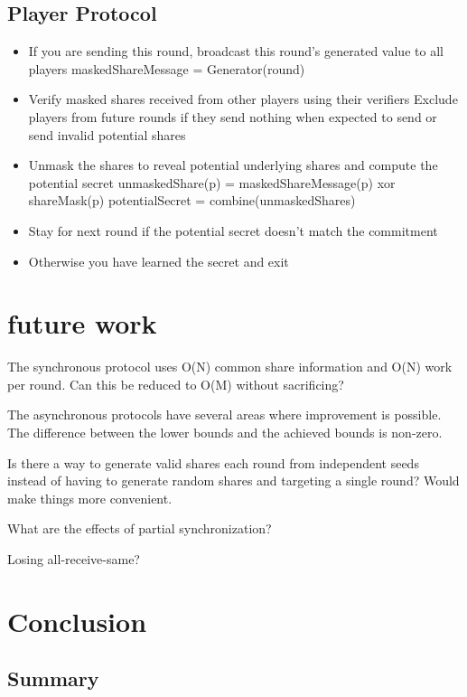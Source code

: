 \documentclass{dalcsthesis}
\begin{document}
\section{Player Protocol}
\begin{itemize}
	\item If you are sending this round, broadcast this round's generated value to all players
	  \subitem maskedShareMessage = Generator(round)
	\item Verify masked shares received from other players using their verifiers
	  \subitem Exclude players from future rounds if they send nothing when expected to send or send invalid potential shares
	\item Unmask the shares to reveal potential underlying shares and compute the potential secret
	  \subitem unmaskedShare(p) = maskedShareMessage(p) xor shareMask(p)
	  \subitem potentialSecret = combine(unmaskedShares)
	\item Stay for next round if the potential secret doesn't match the commitment
	\item Otherwise you have learned the secret and exit
\end{itemize}

\chapter{future work}

The synchronous protocol uses O(N) common share information and O(N) work per round. Can this be reduced to O(M) without sacrificing?

The asynchronous protocols have several areas where improvement is possible. The difference between the lower bounds and the achieved bounds is non-zero.

Is there a way to generate valid shares each round from independent seeds instead of having to generate random shares and targeting a single round? Would make things more convenient.

What are the effects of partial synchronization?

Losing all-receive-same?

\chapter{Conclusion}

\section{Summary}
\end{document}
